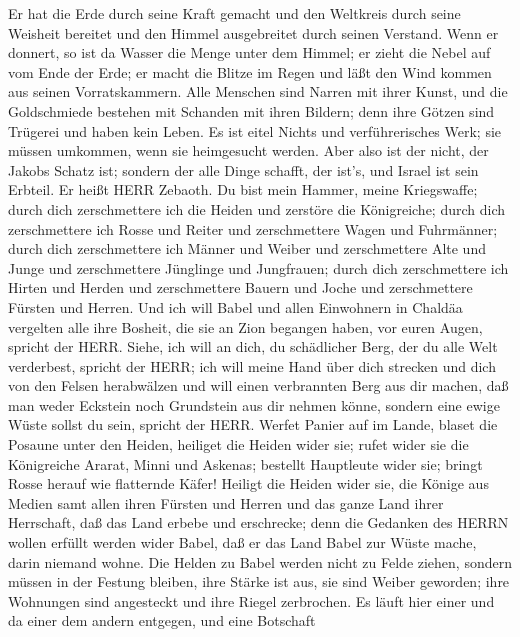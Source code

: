  Er hat die Erde durch seine Kraft gemacht und den
Weltkreis durch seine Weisheit bereitet und den Himmel ausgebreitet
durch seinen Verstand.  Wenn er donnert, so ist da Wasser
die Menge unter dem Himmel; er zieht die Nebel auf vom Ende der Erde; er
macht die Blitze im Regen und läßt den Wind kommen aus seinen
Vorratskammern.  Alle Menschen sind Narren mit ihrer Kunst,
und die Goldschmiede bestehen mit Schanden mit ihren Bildern; denn ihre
Götzen sind Trügerei und haben kein Leben.  Es ist eitel
Nichts und verführerisches Werk; sie müssen umkommen, wenn sie
heimgesucht werden.  Aber also ist der nicht, der Jakobs
Schatz ist; sondern der alle Dinge schafft, der ist's, und Israel ist
sein Erbteil. Er heißt HERR Zebaoth.  Du bist mein Hammer,
meine Kriegswaffe; durch dich zerschmettere ich die Heiden und zerstöre
die Königreiche;  durch dich zerschmettere ich Rosse und
Reiter und zerschmettere Wagen und Fuhrmänner;  durch dich
zerschmettere ich Männer und Weiber und zerschmettere Alte und Junge und
zerschmettere Jünglinge und Jungfrauen;  durch dich
zerschmettere ich Hirten und Herden und zerschmettere Bauern und Joche
und zerschmettere Fürsten und Herren.  Und ich will Babel
und allen Einwohnern in Chaldäa vergelten alle ihre Bosheit, die sie an
Zion begangen haben, vor euren Augen, spricht der HERR. 
Siehe, ich will an dich, du schädlicher Berg, der du alle Welt
verderbest, spricht der HERR; ich will meine Hand über dich strecken und
dich von den Felsen herabwälzen und will einen verbrannten Berg aus dir
machen,  daß man weder Eckstein noch Grundstein aus dir
nehmen könne, sondern eine ewige Wüste sollst du sein, spricht der HERR.
 Werfet Panier auf im Lande, blaset die Posaune unter den
Heiden, heiliget die Heiden wider sie; rufet wider sie die Königreiche
Ararat, Minni und Askenas; bestellt Hauptleute wider sie; bringt Rosse
herauf wie flatternde Käfer!  Heiligt die Heiden wider sie,
die Könige aus Medien samt allen ihren Fürsten und Herren und das ganze
Land ihrer Herrschaft,  daß das Land erbebe und erschrecke;
denn die Gedanken des HERRN wollen erfüllt werden wider Babel, daß er
das Land Babel zur Wüste mache, darin niemand wohne.  Die
Helden zu Babel werden nicht zu Felde ziehen, sondern müssen in der
Festung bleiben, ihre Stärke ist aus, sie sind Weiber geworden; ihre
Wohnungen sind angesteckt und ihre Riegel zerbrochen.  Es
läuft hier einer und da einer dem andern entgegen, und eine Botschaft
